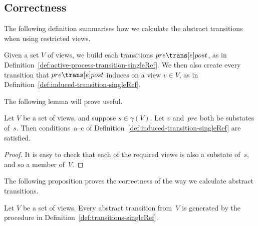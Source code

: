 \subsection{Correctness}

The following definition summarises how we calculate the abstract transitions
when using restricted views.
%
\begin{definition}
\label{def:transitions-singleRef}
Given a set $V$ of views, we build each  transitions $pre \trans[e]
post$, as in Definition~\ref{def:active-process-transition-singleRef}.
%
We then also create every transition that $pre \trans[e] post$ induces on a
view $v \in V$, as in Definition~\ref{def:induced-transition-singleRef}.
\end{definition}

The following lemma will prove useful.
%
\begin{lemma}
\label{lem:induced-conditions}
Let $V$ be a set of views, and suppose $s \in \gamma(V)$.  Let $v$ and~$pre$
both be substates of~$s$.  Then conditions~a--c of
Definition~\ref{def:induced-transition-singleRef} are satisfied.
\end{lemma}
%
\begin{proof}
It is easy to check that each of the required views is also a substate of~$s$,
and so a member of~$V$.
\end{proof}


The following proposition proves the correctness of the way we calculate
abstract transitions.
%
\begin{prop}
Let $V$ be a set of views.  Every abstract transition from~$V$ is generated by
the procedure in Definition~\ref{def:transitions-singleRef}.
\end{prop}

